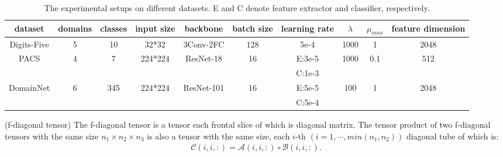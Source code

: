 \documentclass[10pt,twocolumn,letterpaper]{article}
\begin{document}
\begin{table*}[t]
	\begin{tabular}{clccccccccc}
		\hline
		\multicolumn{2}{c}{dataset}                    & domains            & classes              & input size               & backbone                    & batch size          & learning rate              & $\lambda$                & $\mu_{max}$                   & feature dimension     \\ \hline
		\multicolumn{2}{c}{Digits-Five}                & 5                  & 10                   & 32*32                    & 3Conv-2FC                   & 128                 & 5e-4                       & 1000                  & 1                    & 2048                  \\
		\multicolumn{2}{c}{\multirow{2}{*}{PACS}}      & \multirow{2}{*}{4} & \multirow{2}{*}{7}   & \multirow{2}{*}{224*224} & \multirow{2}{*}{ResNet-18}  & \multirow{2}{*}{16} & E:3e-5                     & \multirow{2}{*}{1000} & \multirow{2}{*}{0.1} & \multirow{2}{*}{512}  \\
		\multicolumn{2}{c}{}                           &                    &                      &                          &                             &                     & C:1e-3                     &                       &                      &                       \\
		\multicolumn{2}{c}{\multirow{2}{*}{DomainNet}} & \multirow{2}{*}{6} & \multirow{2}{*}{345} & \multirow{2}{*}{224*224} & \multirow{2}{*}{ResNet-101} & \multirow{2}{*}{16} & E:5e-5                     & \multirow{2}{*}{100}  & \multirow{2}{*}{1}   & \multirow{2}{*}{2048} \\
		\multicolumn{2}{c}{}                           &                    &                      &                          &                             &                     & {C:5e-4} &                       &                      &                       \\ \hline	
	\end{tabular}
	\caption{The experimental setups on different datasets. E and C denote feature extractor and classifier, respectively.}
	\label{tab5}
\end{table*}
{ (f-diagonal tensor) The f-diagonal tensor is a tensor each frontal slice of which is diagonal matrix. The tensor product of two f-diagonal tensors with the same size $n_1\times n_2 \times n_3$ is also a tensor with the same size, each $i$-th $(i=1,\cdots,min(n_1, n_2))$ diagonal tube of which is:
\begin{align}
	\mathcal{C}(i,i,:)=\mathcal{A}(i,i,:)\circ \mathcal{B}(i,i,:).
\end{align}
}
\end{document}
